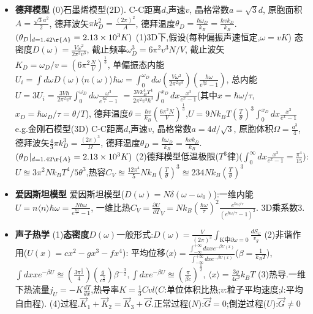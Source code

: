 \documentclass[UTF8,a4paper,1pt,twocolumn]{ctexart}
\begin{document}
\begin{itemize}
  \item \textbf{德拜模型}
  (0)石墨烯模型(2D).
  C-C距离$d$,声速$v$,
  晶格常数$a=\sqrt{3}d$,
  原胞面积$A=\frac{\sqrt{3}a^2}{2}$,
  德拜波矢$\pi k_D^2=\frac{(2\pi)^2}{A}$,
  德拜温度$\theta_D=\frac{\hbar\omega_D}{k_B}=\frac{\hbar v k_D}{k_B}$.
  $(\theta_D|_{d=1.42\r{A}}=2.13\times10^3K)$
  (1)3D下,假设(每种偏振声速恒定,$\omega=vK$)
  态密度$D(\omega)=\frac{V\omega^2}{2\pi^{2}v^3}$,
  截止频率$\omega_{D}^3=6\pi^{2}v^{3}N/V$,
  截止波矢$K_{D}=\omega_{D}/v=(6\pi^{2}\frac{N}{V})^{\frac{1}{3}}$,
  单偏振态内能$U_i=\int d\omega D(\omega)\langle n(\omega)\rangle\hbar\omega
  =\int_{0}^{\omega_{D}}d\omega(\frac{V\omega^{2}}{2\pi^{2}v^{3}})(\frac{\hbar\omega}{e^{\frac{\hbar\omega}{\tau}}-1})$,
  总内能$U=3U_i=\frac{3V\hbar}{2\pi^2 v^3}\int_{0}^{\omega_{D}}d\omega\frac{\omega^3}{e^{\frac{\hbar\omega}{\tau}}-1}$
  $=\frac{3Vk_{B}^{4}T^{4}}{2\pi^2 v^3 \hbar^3}\int_{0}^{x_{D}}dx\frac{x^3}{e^x - 1}$(其中$x=\hbar\omega/\tau$,$x_{D}=\hbar\omega_{D}/\tau=\theta/T$),
  德拜温度$\theta=\frac{\hbar v}{k_{B}}(\frac{6\pi^2N}{V})^{\frac{1}{3}}$,$U=9Nk_{B}T(\frac{T}{\theta})^3\int_{0}^{x_D}dx\frac{x^3}{e^x -1}$
  e.g.金刚石模型(3D)
  C-C距离$d$,声速$v$,
  晶格常数$a=4d/\sqrt{3}$,
  原胞体积$\Omega=\frac{a^3}{4}$,
  德拜波矢$\frac{4}{3}\pi k_D^3=\frac{(2\pi)^3}{\Omega}$,
  德拜温度$\theta_D=\frac{\hbar\omega_D}{k_B}=\frac{\hbar v k_D}{k_B}$.
  $(\theta_D|_{d=1.42\r{A}}=2.13\times10^3K)$
  (2)德拜模型低温极限($T^3$律)($\int_{0}^{\infty}dx\frac{x^3}{e^x -1}=\frac{\pi^4}{15}$):$U\approxeq3\pi^2 Nk_{B}T^4/5\theta^3$,热容$C_{V}\approxeq\frac{12\pi^4}{5}Nk_{B}(\frac{T}{\theta})^3\approxeq 234Nk_{B}(\frac{T}{\theta})^3$
  
  \item \textbf{爱因斯坦模型}
  爱因斯坦模型($D(\omega)=N\delta(\omega-\omega_{0})$):一维内能$U=n\langle n\rangle\hbar\omega=\frac{N\hbar\omega}{e^{\frac{\hbar\omega}{\tau}}-1}$,
  一维比热$C_{V}=\frac{\partial U}{\partial T}_{V}=Nk_{B}(\frac{\hbar\omega}{\tau})^2\frac{e^{\hbar\omega/\tau}}{(e^{\hbar\omega/\tau}-1)^2}$.
  3D乘系数3.
  
  \item \textbf{声子热学}
  (1)\textbf{态密度}$D(\omega)$一般形式:$D(\omega)=\frac{V}{(2\pi)^3}\int_{\text{K中}\partial\omega=0}\frac{dS_{\omega}}{v_{g}}$
  (2)非谐作用($U(x)=cx^2-gx^3-fx^4$):
  平均位移$\langle x\rangle=\frac{\int_{-\infty}^{+\infty}dx xe^{-\beta U(x)}}{\int_{-\infty}^{+\infty}dx e^{-\beta U(x)}}$($\beta=\frac{1}{k_{B}T}$),
  $\int dx xe^{-\beta U}\approxeq(\frac{3\pi^{\frac{1}{2}}}{4})(\frac{g}{c^{\frac{5}{2}}})\beta^{-\frac{3}{2}},\int dxe^{-\beta U}\approxeq(\frac{\pi}{\beta c})^{\frac{1}{2}}$,
  $\langle x\rangle=\frac{3g}{4c^2}k_{B}T$
  (3)热导.一维下热流量$j_{U}=-K\frac{dT}{dx}$,热导率$K=\frac{1}{3}Cvl$($C$:单位体积比热;$v$:粒子平均速度;$l$:平均自由程).
  (4)过程.$\vec{K}_{1}+\vec{K}_{2}=\vec{K}_{3}+\vec{G}$.正常过程($N$):$\vec{G}=0$;倒逆过程($U$):$\vec{G}\neq 0$


\end{itemize}
\end{document}
